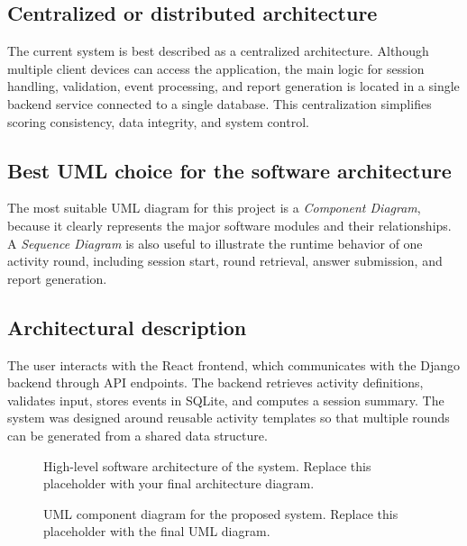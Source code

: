 \documentclass[conference]{IEEEtran}
\begin{document}
\subsection{Centralized or distributed architecture}

The current system is best described as a centralized architecture. Although multiple client devices can access the application, the main logic for session handling, validation, event processing, and report generation is located in a single backend service connected to a single database. This centralization simplifies scoring consistency, data integrity, and system control.

\subsection{Best UML choice for the software architecture}

The most suitable UML diagram for this project is a \textit{Component Diagram}, because it clearly represents the major software modules and their relationships. A \textit{Sequence Diagram} is also useful to illustrate the runtime behavior of one activity round, including session start, round retrieval, answer submission, and report generation.

\subsection{Architectural description}

The user interacts with the React frontend, which communicates with the Django backend through API endpoints. The backend retrieves activity definitions, validates input, stores events in SQLite, and computes a session summary. The system was designed around reusable activity templates so that multiple rounds can be generated from a shared data structure.

\begin{figure}[htbp]
\centering
{}
\caption{High-level software architecture of the system. Replace this placeholder with your final architecture diagram.}
\label{fig:architecture}
\end{figure}

\begin{figure}[htbp]
\centering
{}
\caption{UML component diagram for the proposed system. Replace this placeholder with the final UML diagram.}
\label{fig:uml_component}
\end{figure}
\end{document}
